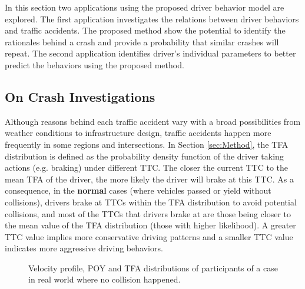 

In this section two applications using the proposed driver behavior model are explored. The first application investigates the relations  between driver behaviors and traffic accidents. The proposed method show the potential to identify the rationales behind a crash and provide a probability that similar crashes will repeat. The second application identifies driver's individual parameters to better predict the behaviors using the proposed method. 


\subsection{On Crash Investigations}
\label{subsec:CrashSim}

Although reasons behind each traffic accident vary with a broad possibilities from weather conditions to  infrastructure design, traffic accidents happen more frequently in some regions and intersections. In Section \ref{sec:Method}, the TFA distribution is defined as the probability density function of the driver taking actions (e.g. braking) under different TTC. The closer the current TTC to the mean TFA of the driver, the more likely the driver will brake at this TTC. As a consequence, in the \textbf{normal} cases (where vehicles passed or yield without collisions), drivers brake at TTCs within the TFA distribution to avoid potential collisions, and most of the TTCs that drivers brake at are those being closer to the mean value of the TFA distribution (those with higher likelihood). A greater TTC value implies more  conservative driving patterns and a smaller TTC value indicates more aggressive driving behaviors. 

\begin{figure}[htbp!]
    \centering
    \hfill
    \hfill
    \caption{Velocity profile, POY and TFA distributions of participants of a case in real world where no collision happened.}
\label{fig:case_normal} 
\end{figure}



